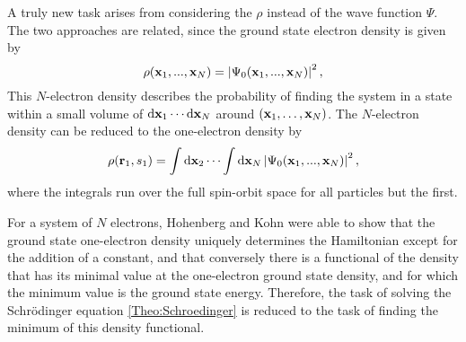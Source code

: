 \documentclass[8.5pt,twoside,twocolumn]{article}
\newcommand\di{\te{d}}
\renewcommand\r{\bo r}
\theoremstyle{standard}
\begin{document}
A truly new task arises from considering the  $\rho$ instead of the wave function
$\Psi$. The two approaches are related, since the ground state electron density is given by
\begin{equation}
 \rho(\mathbf{x}_1,...,\mathbf{x}_N)=\left|{\Psi_0(\mathbf{x}_1,...,\mathbf{x}_N)}\right|^2,
 \label{Theo:NElectronDensity}
\end{equation}
This $N$-electron density describes the probability of finding the system in a state within 
a small volume of $\di \x_1 \cdots \di \x_N$ around $(\mathbf{x}_1,\ldots,\mathbf{x}_N)$. 
The $N$-electron density can be reduced to the one-electron density by
\begin{equation}
 \rho(\r_1,s_1)=\int\di\x_2 \cdots \int\di \x_N \abs{\Psi_0(\x_1,...,\x_N)}^2,
 \label{Theo:1ElectronDensity}
\end{equation}
where the integrals run over %
the full spin-orbit space for all particles but the first.

For a system of $N$ electrons, Hohenberg and Kohn \cite{HohenbergKohn} were able to show that the ground state
one-electron density uniquely determines the Hamiltonian except for the addition of a constant,
and that conversely there is a functional of the density that has its minimal value at the one-electron
ground state density, and for which the minimum value is the ground state energy. Therefore, the task
of solving the Schrödinger equation \eqref{Theo:Schroedinger} is reduced to the task of finding
the minimum of this density functional.
\end{document}
